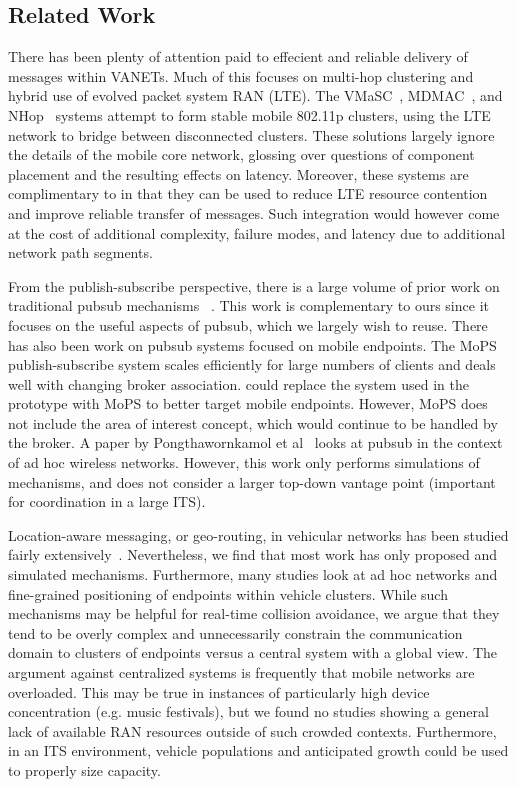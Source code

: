 \subsection{Related Work}

There has been plenty of attention paid to effecient and reliable
delivery of messages within VANETs.  Much of this focuses on multi-hop
clustering and hybrid use of evolved packet system RAN (LTE).  The
VMaSC~\cite{ucar2016multihop}, MDMAC~\cite{wolny2008modified}, and
NHop~\cite{zhang2011novel} systems attempt to form stable mobile
802.11p clusters, using the LTE network to bridge between disconnected
clusters. These solutions largely ignore the details of the mobile
core network, glossing over questions of component placement and the
resulting effects on latency. Moreover, these systems are
complimentary to \name{} in that they can be used to reduce LTE
resource contention and improve reliable transfer of messages. Such
integration would however come at the cost of additional complexity,
failure modes, and latency due to additional network path segments.

From the publish-subscribe perspective, there is a large volume of
prior work on traditional pubsub mechanisms~\cite{hartenstein2008tutorial}
\cite{mir2014lte} \cite{kim2012performance} \cite{araniti2013lte}.
This work is complementary to ours since it focuses on the useful
aspects of pubsub, which we largely wish to reuse. There has also been
work on pubsub systems focused on mobile endpoints. The
MoPS~\cite{nasim2014mobile} publish-subscribe system scales
efficiently for large numbers of clients and deals well with changing
broker association.  \name{} could replace the \pubsub{} system used in
the prototype with MoPS to better target mobile endpoints. However,
MoPS does not include the area of interest concept, which would
continue to be handled by the \name{} broker. A paper by
Pongthawornkamol et al~\cite{pongthawornkamol2007analysis} looks at
pubsub in the context of ad hoc wireless networks. However, this work
only performs simulations of mechanisms, and does not consider a
larger top-down vantage point (important for coordination in a large
ITS).

Location-aware messaging, or geo-routing, in vehicular networks has
been studied fairly extensively~\cite{bilal2013position}.
Nevertheless, we find that most work has only proposed and simulated
mechanisms. Furthermore, many studies look at ad hoc networks and
fine-grained positioning of endpoints within vehicle clusters.  While
such mechanisms may be helpful for real-time collision avoidance, we
argue that they tend to be overly complex and unnecessarily constrain
the communication domain to clusters of endpoints versus a central
system with a global view. The argument against centralized systems is
frequently that mobile networks are overloaded. This may be true in
instances of particularly high device concentration (e.g. music
festivals), but we found no studies showing a general lack of
available RAN resources outside of such crowded contexts.
Furthermore, in an ITS environment, vehicle populations and
anticipated growth could be used to properly size capacity.

